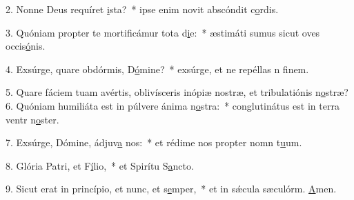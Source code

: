 2. Nonne Deus requíret \uline{i}sta?~* ipse enim novit abscóndit c\uline{o}rdis.\par 
3. Quóniam propter te mortificámur tota d\uline{i}e:~* æstimáti sumus sicut oves occis\uline{ó}nis.\par 
4. Exsúrge, quare obdórmis, D\uline{ó}mine?~* exsúrge, et ne repéllas n f\uline{i}nem.\par 
5. Quare fáciem tuam avértis, oblivísceris inópiæ nostræ, et tribulatiónis n\uline{o}stræ?
6. Quóniam humiliáta est in púlvere ánima n\uline{o}stra:~* conglutinátus est in terra ventr n\uline{o}ster.\par 
7. Exsúrge, Dómine, ádjuv\uline{a} nos:~* et rédime nos propter nomn t\uline{u}um.\par 
8. Glória Patri, et F\uline{í}lio,~* et Spirítu S\uline{a}ncto.\par 
9. Sicut erat in princípio, et nunc, et s\uline{e}mper,~* et in sǽcula sæculórm. \uline{A}men.\par 
